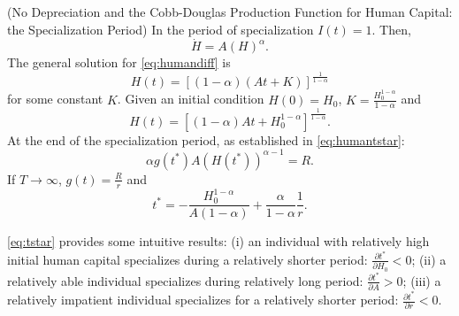 \begin{case} (No Depreciation and the Cobb-Douglas Production Function for Human Capital: the Specialization Period)
In the period of specialization $I(t) = 1$. Then,
\begin{equation}
\dot{H} = A \left( H \right)^{\alpha} \label{eq:humandiff}.
\end{equation}
The general solution for \eqref{eq:humandiff} is
\begin{equation}
H(t) = \left[ (1 - \alpha)(At + K) \right]^{\frac{1}{1-\alpha}}
\end{equation}
for some constant $K$. Given an initial condition $H(0) = H_{0}$, $K = \frac{H_{0}^{1-\alpha}}{1-\alpha}$ and
\begin{equation}
H(t) = \left[ (1 - \alpha)At + H_{0}^{1-\alpha} \right]^{\frac{1}{1-\alpha}} \label{eq:hbeforetstar}.
\end{equation}
At the end of the specialization period, as established in \eqref{eq:humantstar}:
\begin{equation}
\alpha g(t^*) A \left( H(t^*) \right)^{\alpha - 1} = R.
\end{equation}
If $T \rightarrow \infty$, $g(t) = \frac{R}{r}$ and
\begin{equation}
t^* = - \frac{H_{0}^{1 - \alpha}}{A(1 - \alpha)} + \frac{\alpha}{1 - \alpha}\frac{1}{r}. \label{eq:tstar}
\end{equation}

\indent \eqref{eq:tstar} provides some intuitive results: (i) an individual with relatively high initial human capital specializes during a relatively shorter period: $\frac{\partial t^*}{\partial       H_{0}} < 0$; (ii) a relatively able individual specializes during relatively long period: $\frac{\partial t^*}{\partial A} > 0$; (iii) a relatively impatient individual specializes for a relatively shorter period: $\frac{\partial t^*}{\partial r} < 0$.
\end{case}

